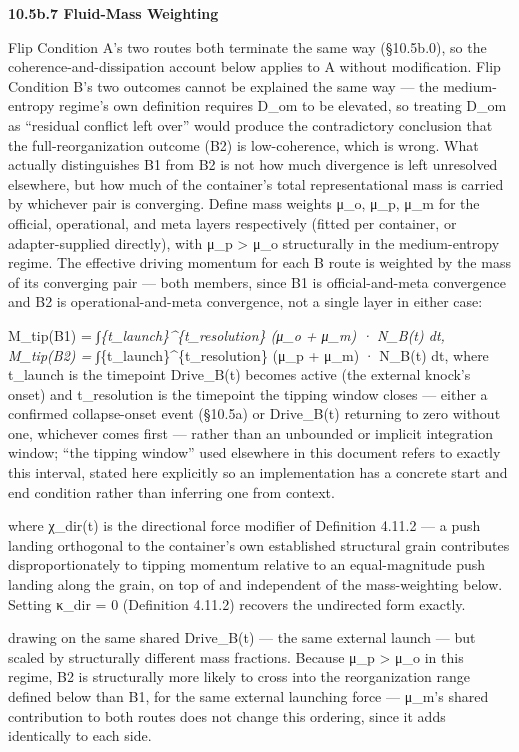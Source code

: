 \documentclass[
]{article}
\begin{document}
\textbf{10.5b.7 Fluid-Mass Weighting}

Flip Condition A's two routes both terminate the same way (§10.5b.0), so
the coherence-and-dissipation account below applies to A without
modification. Flip Condition B's two outcomes cannot be explained the
same way --- the medium-entropy regime's own definition requires D\_om
to be elevated, so treating D\_om as ``residual conflict left over''
would produce the contradictory conclusion that the full-reorganization
outcome (B2) is low-coherence, which is wrong. What actually
distinguishes B1 from B2 is not how much divergence is left unresolved
elsewhere, but how much of the container's total representational mass
is carried by whichever pair is converging. Define mass weights μ\_o,
μ\_p, μ\_m for the official, operational, and meta layers respectively
(fitted per container, or adapter-supplied directly), with μ\_p
\textgreater{} μ\_o structurally in the medium-entropy regime. The
effective driving momentum for each B route is weighted by the mass of
its converging pair --- both members, since B1 is official-and-meta
convergence and B2 is operational-and-meta convergence, not a single
layer in either case:

M\_tip(B1) = ∫\emph{\{t\_launch\}\^{}\{t\_resolution\} (μ\_o + μ\_m) ·
N\_B(t) dt, M\_tip(B2) = ∫}\{t\_launch\}\^{}\{t\_resolution\} (μ\_p +
μ\_m) · N\_B(t) dt, where t\_launch is the timepoint Drive\_B(t) becomes
active (the external knock's onset) and t\_resolution is the timepoint
the tipping window closes --- either a confirmed collapse-onset event
(§10.5a) or Drive\_B(t) returning to zero without one, whichever comes
first --- rather than an unbounded or implicit integration window; ``the
tipping window'' used elsewhere in this document refers to exactly this
interval, stated here explicitly so an implementation has a concrete
start and end condition rather than inferring one from context.

where χ\_dir(t) is the directional force modifier of Definition 4.11.2
--- a push landing orthogonal to the container's own established
structural grain contributes disproportionately to tipping momentum
relative to an equal-magnitude push landing along the grain, on top of
and independent of the mass-weighting below. Setting κ\_dir = 0
(Definition 4.11.2) recovers the undirected form exactly.

drawing on the same shared Drive\_B(t) --- the same external launch ---
but scaled by structurally different mass fractions. Because μ\_p
\textgreater{} μ\_o in this regime, B2 is structurally more likely to
cross into the reorganization range defined below than B1, for the same
external launching force --- μ\_m's shared contribution to both routes
does not change this ordering, since it adds identically to each side.
\end{document}
